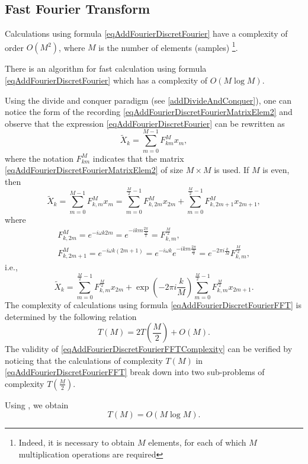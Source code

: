\subsection{Fast Fourier Transform}
Calculations using formula \eqref{eqAddFourierDiscretFourier} have a complexity of order $O\left(M^2\right)$, where $M$ is the number of elements (samples) \footnote{Indeed, it is necessary to obtain $M$ elements, for each of which $M$ multiplication operations are required}. 

There is an algorithm for fast calculation using formula \eqref{eqAddFourierDiscretFourier} which has a complexity of $O\left(M \log{M}\right)$.

Using the divide and conquer paradigm (see \autoref{addDivideAndConquer}), one can notice the form of the recording \eqref{eqAddFourierDiscretFourierMatrixElem2} and observe that the expression \eqref{eqAddFourierDiscretFourier} can be rewritten as
\begin{equation}
\tilde{X}_k = \sum^{M - 1}_{m = 0} F_{km}^{M} x_m,
\nonumber
\end{equation}
where the notation $F_{km}^{M}$ indicates that the matrix \eqref{eqAddFourierDiscretFourierMatrixElem2} of size $M \times M$ is used.
If $M$ is even, then
\begin{equation}
\tilde{X}_k = \sum^{M - 1}_{m = 0} F_{k,m}^{M} x_m = 
\sum^{\frac{M}{2} - 1}_{m = 0} F_{k,2m}^M x_{2m} +
\sum^{\frac{M}{2} - 1}_{m = 0} F_{k,2m + 1}^M x_{2m + 1},
\nonumber
\end{equation}
where
\begin{eqnarray}
F_{k,2m}^{M} = e^{-i \omega k 2m} = e^{-i k m \frac{2\pi}{\frac{M}{2}}
} = F_{k,m}^{\frac{M}{2}},
\nonumber \\
F_{k,2m + 1}^{M} = e^{-i \omega k \left(2m+1\right)} = 
e^{-i \omega k}e^{-i k m \frac{2\pi}{\frac{M}{2}}} = 
e^{-2\pi i \frac{k}{M}}F_{k,m}^{\frac{M}{2}},
\nonumber
\end{eqnarray}
i.e.,
\begin{equation}
\tilde{X}_k = \sum^{\frac{M}{2} - 1}_{m = 0} F_{k,m}^{\frac{M}{2}} x_{2m} +
\exp{\left(-2\pi i \frac{k}{M}\right)}
\sum^{\frac{M}{2} - 1}_{m = 0}  F_{k,m}^{\frac{M}{2}} x_{2m + 1}.
\label{eqAddFourierDiscretFourierFFT}
\end{equation}
The complexity of calculations using formula \eqref{eqAddFourierDiscretFourierFFT} is determined by the following relation
\begin{equation}
T\left( M \right) = 2 T\left( \frac{M}{2} \right) + O\left( M \right).
\label{eqAddFourierDiscretFourierFFTComplexity}
\end{equation}
The validity of \eqref{eqAddFourierDiscretFourierFFTComplexity} can be verified by noticing that the calculations of complexity $T\left( M \right)$ in \eqref{eqAddFourierDiscretFourierFFT} break down into two sub-problems of complexity $T\left( \frac{M}{2} \right)$.

Using , we obtain
\begin{equation}
T\left( M \right) = O\left( M \log{M} \right).
\nonumber
\end{equation}